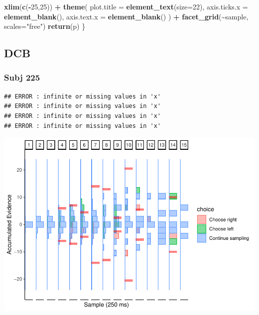 \documentclass[
]{book}
\newenvironment{Shaded}{\begin{snugshade}}{\end{snugshade}}
\newcommand{\AttributeTok}[1]{\textcolor[rgb]{0.13,0.29,0.53}{#1}}
\newcommand{\DecValTok}[1]{\textcolor[rgb]{0.00,0.00,0.81}{#1}}
\newcommand{\FunctionTok}[1]{\textcolor[rgb]{0.13,0.29,0.53}{\textbf{#1}}}
\newcommand{\NormalTok}[1]{#1}
\newcommand{\SpecialCharTok}[1]{\textcolor[rgb]{0.81,0.36,0.00}{\textbf{#1}}}
\newcommand{\StringTok}[1]{\textcolor[rgb]{0.31,0.60,0.02}{#1}}
\begin{document}
\begin{Shaded}
\begin{Highlighting}[]
    \FunctionTok{xlim}\NormalTok{(}\FunctionTok{c}\NormalTok{(}\SpecialCharTok{{-}}\DecValTok{25}\NormalTok{,}\DecValTok{25}\NormalTok{)) }\SpecialCharTok{+}
    \FunctionTok{theme}\NormalTok{(}
      \AttributeTok{plot.title =} \FunctionTok{element\_text}\NormalTok{(}\AttributeTok{size=}\DecValTok{22}\NormalTok{),}
      \AttributeTok{axis.ticks.x =} \FunctionTok{element\_blank}\NormalTok{(),}
      \AttributeTok{axis.text.x =} \FunctionTok{element\_blank}\NormalTok{()}
\NormalTok{    ) }\SpecialCharTok{+}
    \FunctionTok{facet\_grid}\NormalTok{(}\SpecialCharTok{\textasciitilde{}}\NormalTok{sample, }\AttributeTok{scales=}\StringTok{"free"}\NormalTok{)}
  \FunctionTok{return}\NormalTok{(p)}
\NormalTok{\}}
\end{Highlighting}
\end{Shaded}

\hypertarget{dcb-5}{%
\subsection{DCB}\label{dcb-5}}

\hypertarget{subj-225-1}{%
\subsubsection*{Subj 225}\label{subj-225-1}}

\begin{verbatim}
## ERROR : infinite or missing values in 'x' 
## ERROR : infinite or missing values in 'x' 
## ERROR : infinite or missing values in 'x' 
## ERROR : infinite or missing values in 'x'
\end{verbatim}

\includegraphics{LateNightBayes_files/figure-latex/unnamed-chunk-35-1.pdf}
\end{document}
